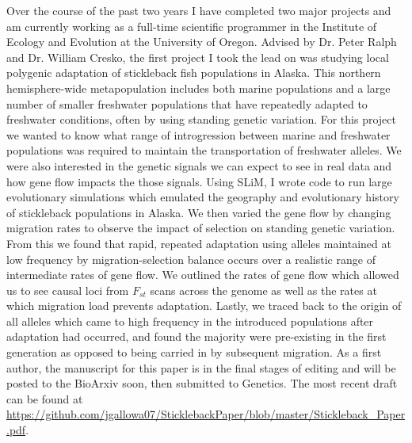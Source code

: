 \documentclass[11pt]{amsart}
\newcommand{\sepspace}{\vspace*{1em}}		%
\begin{document}

Over the course of the past two years I have completed two major projects and am currently working as a full-time scientific programmer in the Institute of Ecology and Evolution at the University of Oregon.
Advised by Dr. Peter Ralph and Dr. William Cresko, the first project I took the lead on was studying local polygenic adaptation of stickleback fish populations in Alaska. 
This northern hemisphere-wide metapopulation includes both marine populations and a large number of smaller freshwater populations that have repeatedly adapted to freshwater conditions, often by using standing genetic variation. 
For this project we wanted to know what range of introgression between marine and freshwater populations was required to maintain the transportation of freshwater alleles.
We were also interested in the genetic signals we can expect to see in real data and how gene flow impacts the those signals. 
Using SLiM, I wrote code to run large evolutionary simulations which emulated the geography and evolutionary history of stickleback populations in Alaska.
We then varied the gene flow by changing migration rates to observe the impact of selection on standing genetic variation. 
From this we found that rapid, repeated adaptation using alleles maintained at low frequency by migration-selection balance occurs over a realistic range of intermediate rates of gene flow.
We outlined the rates of gene flow which allowed us to see causal loci from $F_{st}$ scans across the genome as well as the rates at which migration load prevents adaptation.
Lastly, we traced back to the origin of all alleles which came to high frequency in the introduced populations after adaptation had occurred, and found the majority were pre-existing in the first generation as opposed to being carried in by subsequent migration.
As a first author, the manuscript for this paper is in the final stages of editing and will be posted to the BioArxiv soon, then submitted to Genetics. The most recent draft can be found at
\url{https://github.com/jgallowa07/SticklebackPaper/blob/master/Stickleback_Paper.pdf}.
\sepspace
\end{document}
